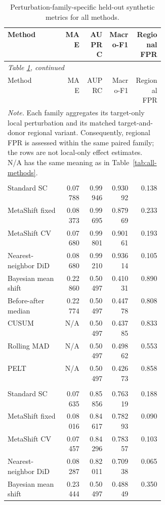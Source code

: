 {\small
\setlength{\tabcolsep}{4pt}
\renewcommand{\arraystretch}{1.06}
\begin{longtable}{@{}p{0.36\linewidth}rrrr@{}}
\caption{Perturbation-family-specific held-out synthetic metrics for all methods.}\label{tab:perturbation-metrics}\\
\toprule
Method & MAE & AUPRC & Macro-F1 & Regional FPR \\
\midrule
\endfirsthead
\multicolumn{5}{l}{\small\itshape Table \ref{tab:perturbation-metrics}, continued}\\
\toprule
Method & MAE & AUPRC & Macro-F1 & Regional FPR \\
\midrule
\endhead
\bottomrule
\multicolumn{5}{p{0.92\linewidth}}{\footnotesize\textit{Note.} Each family aggregates its target-only local perturbation and its matched target-and-donor regional variant. Consequently, regional FPR is assessed within the same paired family; the rows are not local-only effect estimates. N/A has the same meaning as in Table~\ref{tab:all-methods}.}\\
\endfoot
\addlinespace[2pt]
\multicolumn{5}{@{}l}{\textbf{Additive step}}\\
\addlinespace[1pt]
Standard SC & 0.07788 & 0.99946 & 0.93092 & 0.138 \\
MetaShift fixed & 0.08373 & 0.99695 & 0.87969 & 0.233 \\
MetaShift CV & 0.07680 & 0.99801 & 0.90161 & 0.193 \\
Nearest-neighbor DiD & 0.08680 & 0.99210 & 0.93614 & 0.105 \\
Bayesian mean shift & 0.22860 & 0.50497 & 0.41031 & 0.890 \\
Before-after median & 0.22774 & 0.50497 & 0.44778 & 0.808 \\
CUSUM & N/A & 0.50497 & 0.43785 & 0.833 \\
Rolling MAD & N/A & 0.50497 & 0.49862 & 0.553 \\
PELT & N/A & 0.50497 & 0.42673 & 0.858 \\
\addlinespace[2pt]
\multicolumn{5}{@{}l}{\textbf{Proportional step}}\\
\addlinespace[1pt]
Standard SC & 0.07635 & 0.85856 & 0.76319 & 0.188 \\
MetaShift fixed & 0.08016 & 0.84617 & 0.78293 & 0.090 \\
MetaShift CV & 0.07457 & 0.84296 & 0.78357 & 0.103 \\
Nearest-neighbor DiD & 0.08287 & 0.82011 & 0.70938 & 0.065 \\
Bayesian mean shift & 0.23444 & 0.50497 & 0.48849 & 0.350 \\

\end{longtable}}
